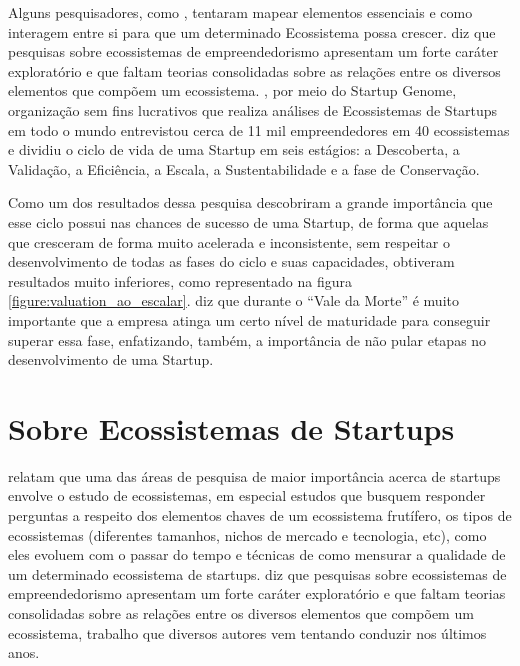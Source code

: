 
Alguns pesquisadores, como , tentaram mapear elementos essenciais e como interagem entre si para que um determinado Ecossistema possa crescer.
  diz que pesquisas sobre ecossistemas de empreendedorismo apresentam um forte caráter exploratório e que faltam teorias consolidadas sobre as relações entre os diversos elementos que compõem um ecossistema. 
 , por meio do Startup Genome, organização sem fins lucrativos que realiza análises de Ecossistemas de Startups em todo o mundo entrevistou cerca de 11 mil empreendedores em 40 ecossistemas e dividiu o ciclo de vida de uma Startup em seis estágios: a Descoberta, a Validação, a Eficiência, a Escala, a Sustentabilidade e a fase de Conservação. 

 Como um dos resultados dessa pesquisa descobriram a grande importância que esse ciclo possui nas chances de sucesso de uma Startup, de forma que aquelas que cresceram de forma muito acelerada e inconsistente, sem respeitar o desenvolvimento de todas as fases do ciclo e suas capacidades, obtiveram resultados muito inferiores, como representado na figura \ref{figure:valuation_ao_escalar}.  diz que durante o ``Vale da Morte'' é muito importante que a empresa atinga um certo nível de maturidade para conseguir superar essa fase, enfatizando, também, a importância de não pular etapas no desenvolvimento de uma Startup.

\chapter[Sobre Ecossistemas de Startups]{Sobre Ecossistemas de Startups}
\label{cap-sobre-ecossistemas-de-startups}

 relatam que uma das áreas de pesquisa de maior importância acerca de startups envolve o estudo de ecossistemas, em especial estudos que busquem responder perguntas a respeito dos elementos chaves de um ecossistema frutífero, os tipos de ecossistemas (diferentes tamanhos, nichos de mercado e tecnologia, etc), como eles evoluem com o passar do tempo e técnicas de como mensurar a qualidade de um determinado ecossistema de startups.  diz que pesquisas sobre ecossistemas de empreendedorismo apresentam um forte caráter exploratório e que faltam teorias consolidadas sobre as relações entre os diversos elementos que compõem um ecossistema, trabalho que diversos autores vem tentando conduzir nos últimos anos.

